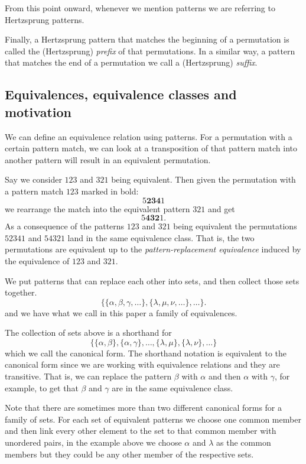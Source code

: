 \documentclass[a4paper, 11pt, english]{article}
\theoremstyle{definition}
\begin{document}
From this point onward, whenever we mention patterns we are referring to
Hertzsprung patterns.

Finally, a Hertzsprung pattern that matches the beginning of a permutation is
called the (Hertzsprung) \emph{prefix} of that permutations. In a similar way, a pattern
that matches the end of a permutation we call a (Hertzsprung) \emph{suffix}.


\subsection{Equivalences, equivalence classes and motivation}
We can define an equivalence relation using patterns. For a permutation with a certain pattern
match, we can look at a transposition of that pattern match into another pattern will result in an
equivalent permutation. 

Say we consider $123$ and $321$ being equivalent. Then given the
permutation with a pattern match $123$ marked in bold:
\[
  5\bm{234}1
\]
we rearrange the match into the equivalent pattern $321$ and get
\[
  5\bm{432}1.
\]
As a consequence of the patterns $123$ and $321$ being equivalent the permutations $52341$ and
$54321$ land in the same equivalence class. That is, the two permutations are equivalent up to the
\emph{pattern-replacement equivalence} induced by the equivalence of $123$ and $321$.

We put patterns that can replace each other into sets, and then collect those sets together. 
\[
    \{ \{\alpha, \beta, \gamma, \dots \}, \{\lambda, \mu, \nu, \dots \}, \dots
    \}.
\]
and we have what we call in this paper a family of equivalences.

The collection of sets above is a shorthand for
\[
    \{ \{ \alpha, \beta \}, \{ \alpha, \gamma \}, \dots, \{ \lambda, \mu \}, \{
        \lambda, \nu \}, \dots \}
\] 
which we call the canonical form. The shorthand notation is equivalent to the canonical form since
we are working with equivalence relations and they are transitive.
That is, we can replace the pattern $\beta$ with $\alpha$ and then $\alpha$ with $\gamma$, for
example, to get that $\beta$ and $\gamma$ are in the same equivalence class.

Note that there are sometimes more than two different canonical forms for a family of sets. For each 
set of equivalent patterns we choose one common member and then link every other element to the set to that common member
with unordered pairs, in the example above we choose $\alpha$ and $\lambda$ as the common members
but they could be any other member of the respective sets.
\end{document}
